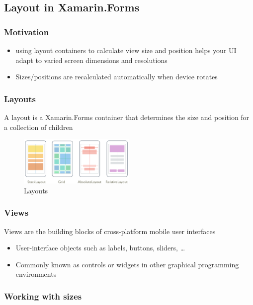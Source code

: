 \documentclass{article}
\begin{document}
\subsection{Layout in Xamarin.Forms}

\subsubsection{Motivation}
\begin{itemize}
    \item using layout containers to calculate view size and position helps your UI adapt to varied screen dimensions and resolutions
    \item Sizes/positions are recalculated automatically when device rotates
\end{itemize}

\subsubsection{Layouts}

A layout is a Xamarin.Forms container that determines the size and position for a collection of children

\begin{figure}[H]
    \centering
    \includegraphics[width=0.5\textwidth]{xaml-layout.png}
    \caption{Layouts}
\end{figure}

\subsubsection{Views}

Views are the building blocks of cross-platform mobile user interfaces

\begin{itemize}
    \item User-interface objects such as labels, buttons, sliders, \dots
    \item Commonly known as controls or widgets in other graphical programming environments
\end{itemize}

\subsubsection{Working with sizes}
\end{document}
